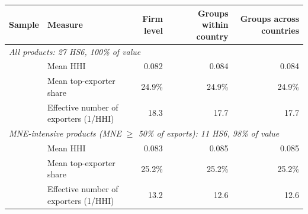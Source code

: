 \begin{tabular}{llrrr}
\toprule
Sample & Measure & Firm level & Groups within country & Groups across countries \\
\midrule
\multicolumn{5}{l}{\textit{All products: 27 HS6, 100\% of value}} \\
 & Mean HHI & 0.082 & 0.084 & 0.084 \\
 & Mean top-exporter share & 24.9\% & 24.9\% & 24.9\% \\
 & Effective number of exporters (1/HHI) & 18.3 & 17.7 & 17.7 \\
\multicolumn{5}{l}{\textit{MNE-intensive products (MNE $\geq$ 50\% of exports): 11 HS6, 98\% of value}} \\
 & Mean HHI & 0.083 & 0.085 & 0.085 \\
 & Mean top-exporter share & 25.2\% & 25.2\% & 25.2\% \\
 & Effective number of exporters (1/HHI) & 13.2 & 12.6 & 12.6 \\
\bottomrule
\end{tabular}
